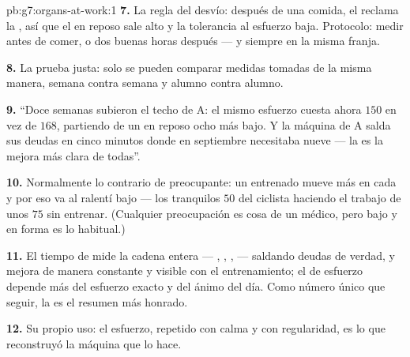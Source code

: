 \begin{solution}{pb:g7:organs-at-work:1}
\textbf{7.} La regla del desvío: después de una comida, el  reclama la , así que el  en reposo sale alto y la
tolerancia al esfuerzo baja. Protocolo: medir antes de comer, o dos
buenas horas después --- y siempre en la misma franja.

\textbf{8.} La prueba justa: solo se pueden comparar medidas tomadas de
la misma manera, semana contra semana y alumno contra alumno.

\textbf{9.} ``Doce semanas subieron el techo de A: el mismo esfuerzo
cuesta ahora $150$  en vez de $168$, partiendo de un  en
reposo ocho  más bajo. Y la máquina de A salda sus deudas en
cinco minutos donde en septiembre necesitaba nueve --- la 
es la mejora más clara de todas''.

\textbf{10.} Normalmente lo contrario de preocupante: un 
entrenado mueve más  en cada  y por eso va al ralentí bajo
--- los tranquilos $50$ del ciclista haciendo el trabajo de unos $75$
sin entrenar. (Cualquier preocupación es cosa de un médico, pero bajo y
en forma es lo habitual.)

\textbf{11.} El tiempo de  mide la cadena entera ---
, , ,  --- saldando deudas de verdad, y
mejora de manera constante y visible con el entrenamiento; el  de
esfuerzo depende más del esfuerzo exacto y del ánimo del día. Como
número único que seguir, la  es el resumen más honrado.

\textbf{12.} Su propio uso: el esfuerzo, repetido con calma y con
regularidad, es lo que reconstruyó la máquina que lo hace.
\end{solution}
